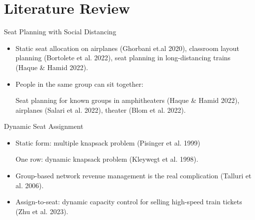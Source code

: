 
\section{Literature Review}
    \frame{\sectionpage}
    \begin{frame}{Seat Planning with Social Distancing}
      \begin{itemize}
        \item {\color{red}Static} seat allocation on {\color{green} airplanes} (Ghorbani et.al 2020), {\color{green} classroom} layout planning (Bortolete et al. 2022), seat planning in long-distancing {\color{green} trains} (Haque \& Hamid 2022).
        \vspace*{0.5cm}

        
        \item People in the same {\color{red}group can sit together}: 
        
        
        \vspace*{0.5cm} 

        Seat planning for known {\color{red}groups} in amphitheaters (Haque \& Hamid 2022), airplanes (Salari et al. 2022), {\color{green} theater} (Blom et al. 2022).   
        
        
      \end{itemize}
      \end{frame}
      
      \begin{frame}{Dynamic Seat Assignment}
        \begin{itemize}
          \item {\color{red}Static form}: multiple knapsack problem (Pisinger et al. 1999)

                {\color{red}One row}: dynamic knapsack problem (Kleywegt et al. 1998).
          \vspace*{0.5cm}

          \item {\color{red}Group-based} network revenue management is the real complication (Talluri et al. 2006).

          \vspace*{0.5cm}
          \item {\color{red} Assign-to-seat}: dynamic capacity control for selling high-speed train
          tickets (Zhu et al. 2023). 
        \end{itemize}

      \end{frame}